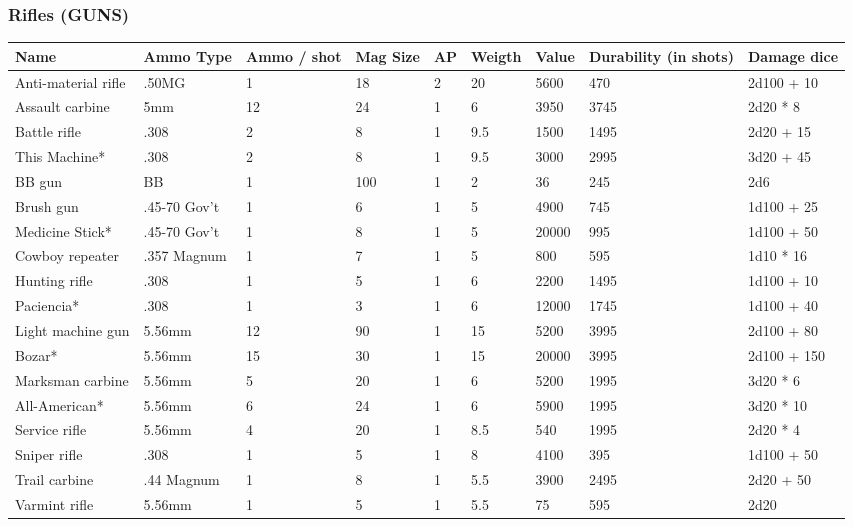 
\subsubsection{Rifles (GUNS)}
\begin{longtable}{|p{3.2cm}|p{2.4cm}|p{1.3cm}|p{.9cm}|p{0.6cm}|p{1.3cm}|p{1cm}|p{2cm}|p{3.2cm}|}
\hline
\bfseries Name & \bfseries Ammo Type & \bfseries Ammo / shot & \bfseries Mag Size & \bfseries AP & \bfseries Weigth & \bfseries Value & \bfseries Durability (in shots) & \bfseries Damage dice \\
\hline
\endhead
Anti-material rifle & .50MG & 1 & 18 & 2 & 20 & 5600 & 470 & 2d100 + 10 \\
Assault carbine & 5mm & 12 & 24 & 1 & 6 & 3950 & 3745 & 2d20 * 8 \\
Battle rifle & .308 & 2 & 8 & 1 & 9.5 & 1500 & 1495 & 2d20 + 15 \\
This Machine* & .308 & 2 & 8 & 1 & 9.5 & 3000 & 2995 & 3d20 + 45 \\
BB gun & BB & 1 & 100 & 1 & 2 & 36 & 245 & 2d6 \\
Brush gun & .45-70 Gov't & 1 & 6 & 1 & 5 & 4900 & 745 & 1d100 + 25 \\
Medicine Stick* & .45-70 Gov't & 1 & 8 & 1 & 5 & 20000 & 995 & 1d100 + 50 \\
Cowboy repeater & .357 Magnum & 1 & 7 & 1 & 5 & 800 & 595 & 1d10 * 16 \\
Hunting rifle & .308 & 1 & 5 & 1 & 6 & 2200 & 1495 & 1d100 + 10 \\
Paciencia* & .308 & 1 & 3 & 1 & 6 & 12000 & 1745 & 1d100 + 40 \\
Light machine gun & 5.56mm & 12 & 90 & 1 & 15 & 5200 & 3995 & 2d100 + 80 \\
Bozar* & 5.56mm & 15 & 30 & 1 & 15 & 20000 & 3995 & 2d100 + 150 \\
Marksman carbine & 5.56mm & 5 & 20 & 1 & 6 & 5200 & 1995 & 3d20 * 6 \\
All-American* & 5.56mm & 6 & 24 & 1 & 6 & 5900 & 1995 & 3d20 * 10 \\
Service rifle & 5.56mm & 4 & 20 & 1 & 8.5 & 540 & 1995 & 2d20 * 4 \\
Sniper rifle & .308 & 1 & 5 & 1 & 8 & 4100 & 395 & 1d100 + 50 \\
Trail carbine & .44 Magnum & 1 & 8 & 1 & 5.5 & 3900 & 2495 & 2d20 + 50 \\
Varmint rifle & 5.56mm & 1 & 5 & 1 & 5.5 & 75 & 595 & 2d20 \\
\hline
\end{longtable}
